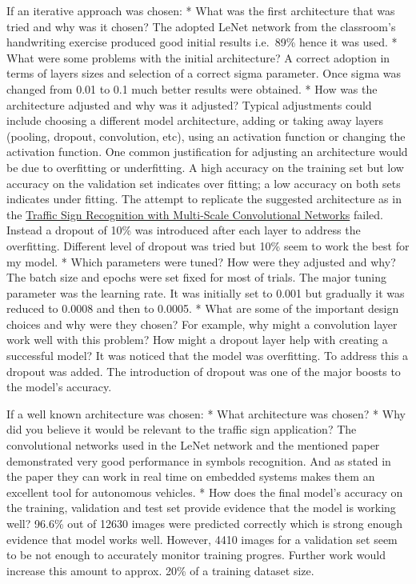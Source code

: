 \documentclass[11pt]{article}
\begin{document}
If an iterative approach was chosen: * What was the first architecture
that was tried and why was it chosen? The adopted LeNet network from the
classroom's handwriting exercise produced good initial results i.e.~89\%
hence it was used. * What were some problems with the initial
architecture? A correct adoption in terms of layers sizes and selection
of a correct sigma parameter. Once sigma was changed from 0.01 to 0.1
much better results were obtained. * How was the architecture adjusted
and why was it adjusted? Typical adjustments could include choosing a
different model architecture, adding or taking away layers (pooling,
dropout, convolution, etc), using an activation function or changing the
activation function. One common justification for adjusting an
architecture would be due to overfitting or underfitting. A high
accuracy on the training set but low accuracy on the validation set
indicates over fitting; a low accuracy on both sets indicates under
fitting. The attempt to replicate the suggested architecture as in the
\href{http://yann.lecun.com/exdb/publis/pdf/sermanet-ijcnn-11.pdf}{Traffic
Sign Recognition with Multi-Scale Convolutional Networks} failed.
Instead a dropout of 10\% was introduced after each layer to address the
overfitting. Different level of dropout was tried but 10\% seem to work
the best for my model. * Which parameters were tuned? How were they
adjusted and why? The batch size and epochs were set fixed for most of
trials. The major tuning parameter was the learning rate. It was
initially set to 0.001 but gradually it was reduced to 0.0008 and then
to 0.0005. * What are some of the important design choices and why were
they chosen? For example, why might a convolution layer work well with
this problem? How might a dropout layer help with creating a successful
model? It was noticed that the model was overfitting. To address this a
dropout was added. The introduction of dropout was one of the major
boosts to the model's accuracy.

If a well known architecture was chosen: * What architecture was chosen?
* Why did you believe it would be relevant to the traffic sign
application? The convolutional networks used in the LeNet network and
the mentioned paper demonstrated very good performance in symbols
recognition. And as stated in the paper they can work in real time on
embedded systems makes them an excellent tool for autonomous vehicles. *
How does the final model's accuracy on the training, validation and test
set provide evidence that the model is working well? 96.6\% out of 12630
images were predicted correctly which is strong enough evidence that
model works well. However, 4410 images for a validation set seem to be
not enough to accurately monitor training progres. Further work would
increase this amount to approx. 20\% of a training dataset size.
\end{document}
